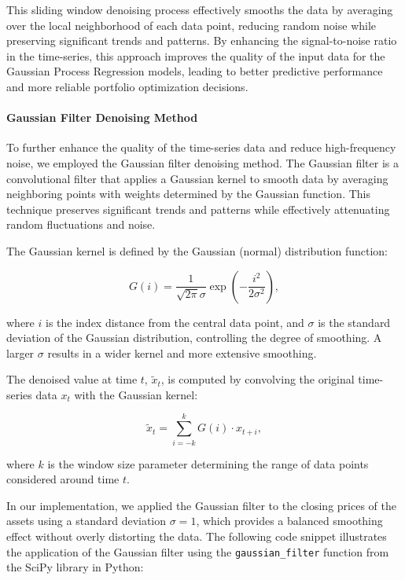 This sliding window denoising process effectively smooths the data by averaging over the local neighborhood of each data point, reducing random noise while preserving significant trends and patterns. By enhancing the signal-to-noise ratio in the time-series, this approach improves the quality of the input data for the Gaussian Process Regression models, leading to better predictive performance and more reliable portfolio optimization decisions.

\paragraph{Gaussian Filter Denoising Method}

To further enhance the quality of the time-series data and reduce high-frequency noise, we employed the Gaussian filter denoising method. The Gaussian filter is a convolutional filter that applies a Gaussian kernel to smooth data by averaging neighboring points with weights determined by the Gaussian function. This technique preserves significant trends and patterns while effectively attenuating random fluctuations and noise.

The Gaussian kernel is defined by the Gaussian (normal) distribution function:

\begin{equation}
G(i) = \frac{1}{\sqrt{2\pi} \sigma} \exp\left( -\frac{i^2}{2\sigma^2} \right),
\end{equation}

where $i$ is the index distance from the central data point, and $\sigma$ is the standard deviation of the Gaussian distribution, controlling the degree of smoothing. A larger $\sigma$ results in a wider kernel and more extensive smoothing.

The denoised value at time $t$, $\tilde{x}_t$, is computed by convolving the original time-series data $x_t$ with the Gaussian kernel:

\begin{equation}
\tilde{x}_t = \sum_{i = -k}^{k} G(i) \cdot x_{t + i},
\end{equation}

where $k$ is the window size parameter determining the range of data points considered around time $t$.

In our implementation, we applied the Gaussian filter to the closing prices of the assets using a standard deviation $\sigma = 1$, which provides a balanced smoothing effect without overly distorting the data. The following code snippet illustrates the application of the Gaussian filter using the \texttt{gaussian\_filter} function from the SciPy library in Python:

